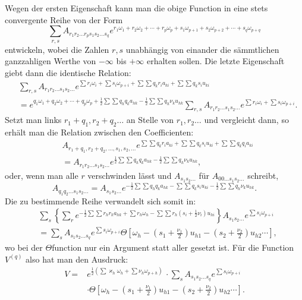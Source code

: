 \documentclass[10pt]{article}
\begin{document}
Wegen der ersten Eigenschaft kann man die obige Function in eine stets convergente Reihe von der Form
\[
\sum_{r,s} A_{r_1r_2\ldots r_ps_1s_2\ldots s_q}
 e^{r_1\omega_1+r_2\omega_2+\cdots+r_p\omega_p+s_1\omega_{p+1}+s_2\omega_{p+2}+\cdots+s_q\omega_{p+q}}
\]
entwickeln, wobei die Zahlen \(r,s\) unabhängig von einander die sämmtlichen ganzzahligen Werthe von \(-\infty\) bis \(+\infty\) erhalten sollen. Die letzte Eigenschaft giebt dann die identische Relation:
\[
\begin{aligned}
&\sum_{r,s} A_{r_1r_2\ldots s_1s_2\ldots}
 e^{\sum r_i\omega_i+\sum s_i\omega_{p+i}+\sum\sum q_kr_ia_{ki}+\sum\sum q_ks_iu_{ki}}\\
&=e^{q_1\omega_1+q_2\omega_2+\cdots+q_p\omega_p+\frac12\sum\sum q_hq_ka_{hk}-\frac12\sum\sum q_h\nu_ku_{hk}}
\sum_{r,s} A_{r_1r_2\ldots s_1s_2\ldots}e^{\sum r_i\omega_i+\sum s_i\omega_{p+i}}.
\end{aligned}
\]
Setzt man links \(r_1+q_1,r_2+q_2\ldots\) an Stelle von \(r_1,r_2\ldots\) und vergleicht dann, so erhält man die Relation zwischen den Coefficienten:
\[
\begin{aligned}
&A_{r_1+q_1,r_2+q_2,\ldots,s_1,s_2,\ldots}
 e^{\sum\sum q_kr_ia_{ki}+\sum\sum q_ks_iu_{ki}+\sum\sum q_kq_ia_{ki}}\\
&=A_{r_1r_2\ldots s_1s_2\ldots}
 e^{\frac12\sum\sum q_hq_ka_{hk}-\frac12\sum\sum q_h\nu_ku_{hk}},
\end{aligned}
\]
oder, wenn man alle \(r\) verschwinden lässt und \(A_{s_1s_2\ldots}\) für \(A_{00\ldots s_1s_2\ldots}\) schreibt,
\[
A_{q_1q_2\ldots s_1s_2\ldots}=A_{s_1s_2\ldots}
 e^{-\frac12\sum\sum q_hq_ka_{hk}-\sum\sum q_ks_iu_{ki}-\frac12\sum\sum q_h\nu_ku_{hk}}.
\]
Die zu bestimmende Reihe verwandelt sich somit in:
\[
\begin{aligned}
&\sum_s\left\{\sum_r e^{-\frac12\sum\sum r_hr_ka_{hk}+\sum r_h\omega_h-
\sum\sum r_h\left(s_i+\frac12\nu_i\right)u_{hi}}\right\}
 A_{s_1s_2\ldots}e^{\sum s_i\omega_{p+i}}\\
&=\sum_s A_{s_1s_2\ldots s_q}e^{\sum s_i\omega_{p+i}}
 \Theta\left[\omega_h-\left(s_1+\frac{\nu_1}{2}\right)u_{h1}-\left(s_2+\frac{\nu_2}{2}\right)u_{h2}\cdots\right],
\end{aligned}
\]
wo bei der \(\Theta\)function nur ein Argument statt aller gesetzt ist. Für die Function \(V^{(q)}\) also hat man den Ausdruck:
\[
\begin{aligned}
V={}&e^{\frac12(\sum\varkappa_h\omega_h+\sum\nu_h\omega_{p+h})}\,\cdot
\sum_s A_{s_1s_2\ldots s_q}e^{\sum s_i\omega_{p+i}}\\
&\cdot\Theta\left[\omega_h-\left(s_1+\frac{\nu_1}{2}\right)u_{h1}-\left(s_2+\frac{\nu_2}{2}\right)u_{h2}\cdots\right].
\end{aligned}
\]
\end{document}
